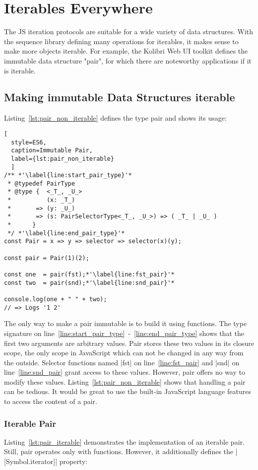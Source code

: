 \section{Iterables Everywhere}
\label{sec:Iterables Everywhere}
The JS iteration protocols are suitable for a wide variety of data structures.
With the sequence library defining many operations for iterables, it makes
sense to make more objects iterable. For example, the Kolibri Web UI toolkit
defines the immutable data structure "pair", for which there are noteworthy
applications if it is iterable. 
\subsection{Making immutable Data Structures iterable}
\label{sub:Making immutable Data Structures iterable}
Listing~\ref{lst:pair_non_iterable} defines the type pair and shows its usage:
\begin{lstlisting}[
  style=ES6, 
  caption=Immutable Pair,
  label={lst:pair_non_iterable}
  ]
/** *'\label{line:start_pair_type}'*
 * @typedef PairType
 * @type {  <_T_, _U_>
 *          (x: _T_)
 *       => (y: _U_)
 *       => (s: PairSelectorType<_T_, _U_>) => ( _T_ | _U_ ) 
 *      }
 */ *'\label{line:end_pair_type}'*
const Pair = x => y => selector => selector(x)(y);

const pair = Pair(1)(2);

const one  = pair(fst);*'\label{line:fst_pair}'*
const two  = pair(snd);*'\label{line:snd_pair}'*

console.log(one + " " + two);
// => Logs '1 2'
\end{lstlisting}

The only way to make a pair immutable is to build it using functions. The type 
signature on line~\ref{line:start_pair_type}~-~\ref{line:end_pair_type} shows 
that the first two arguments are arbitrary values. Pair stores these two values
in its closure scope, the only scope in JavaScript which can not be changed in
any way from the outside.
Selector functions named |fst| on line~\ref{line:fst_pair} and |snd| on 
line~\ref{line:snd_pair} grant access to these values. However, pair offers
no way to modify these values. Listing~\ref{lst:pair_non_iterable} shows that
handling a pair can be tedious. It would be great to use the built-in
JavaScript language features to access the content of a pair.

\subsubsection{Iterable Pair}
\label{subsub:Iterable Pair}
Listing~\ref{lst:pair_iterable} demonstrates the implementation of an iterable 
pair. Still, pair operates only with functions. However, it additionally defines the
|[Symbol.iterator]| property:

